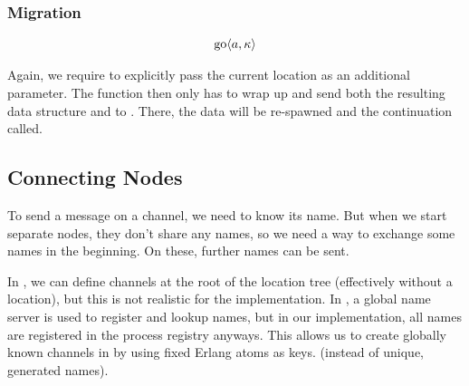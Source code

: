 

\subsubsection{Migration}

\begin{align*}
  \operatorname{go} \langle a, \kappa \rangle
\end{align*}

Again, we require to explicitly pass the current location
as an additional parameter.
The function 
then only has to wrap up  and send both
the resulting data structure and 
to .
There, the data will be re-spawned and the continuation called.



\subsection{Connecting Nodes}

To send a message on a channel, we need to know its name.
But when we start separate nodes, they don't share any names,
so we need a way to exchange some names in the beginning.
On these, further names can be sent.

In \distjoincalc, we can define channels at the root of the location tree
(effectively without a location), but this is not realistic for the
implementation.
In \cite{fournet_jocaml:_2002},
a global name server is used to register and lookup names,
but in our implementation,
all names are registered in the process registry anyways.
This allows us to create globally known channels
in  by using fixed Erlang atoms as keys.
(instead of unique, generated names).


